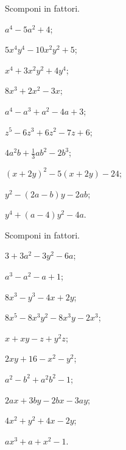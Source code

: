 \begin{esercizio}[\Ast]
 \label{ese:13.104}
 Scomponi in fattori.
 \begin{multicols}{2}
 \begin{enumeratea}
\item $a^{4}-5a^{2}+4$;
\item $5x^{4}y^{4}-10x^{2}y^{2}+5$;
\item $x^{4}+3x^{2}y^{2}+4y^{4}$;
\item $8x^{3}+2x^{2}-3x$;
\item $a^{4}-a^{3}+a^{2}-4a+3$;
\item $z^{5}-6z^{3}+6z^{2}-7z+6$;
\item $4a^{2}b+\frac{1}{3}ab^{2}-2b^{3}$;
\item $(x+2y)^{2}-5(x+2y)-24$;
\item $y^{2}-(2a-b)y-2ab$;
\item $y^{4}+(a-4)y^{2}-4a$.
 \end{enumeratea}
 \end{multicols}
\end{esercizio}

\begin{esercizio}[\Ast]
 \label{ese:13.105}
 Scomponi in fattori.
 \begin{multicols}{2}
 \begin{enumeratea}
\item $3+3a^{2}-3y^{2}-6a$;
\item $a^{3}-a^{2}-a+1$;
\item $8x^{3}-y^{3}-4x+2y$;
\item $8x^{5}-8x^{3}y^{2}-8x^{3}y-2x^{3}$;
\item $x+xy-z+y^{2}z$;
\item $2xy+16-x^{2}-y^{2}$;
\item $a^{2}-b^{2}+a^{2}b^{2}-1$;
\item $2ax+3by-2bx-3ay$;
\item $4x^{2}+y^{2}+4x-2y$;
\item $ax^{3}+a+x^{2}-1$.
 \end{enumeratea}
 \end{multicols}
\end{esercizio}

